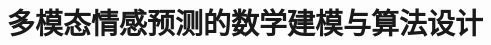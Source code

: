 \documentclass{gmcmthesis}
\title{多模态情感预测的数学建模与算法设计}
\begin{document}
\makecover
\maketitle
\begin{abstract}
  
\end{abstract}

\setcounter{tocdepth}{3}
\maketoc
\startbody







\end{document}
